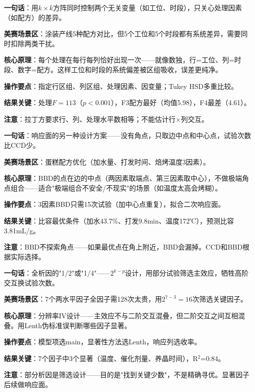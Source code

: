\begin{algobrief}
\textbf{一句话}：用$k\times k$方阵同时控制两个无关变量（如工位、时段），只关心处理因素（如配方）的差异。

\textbf{美赛场景区}：涂装产线5种配方对比，但5个工位和5个时段都有系统差异，需要同时扣除两类干扰。

\textbf{核心原理}：每个处理在每行每列恰好出现一次——就像数独，行=工位、列=时段、数字=配方。这样工位和时段的系统偏差被区组吸收，误差更纯净。

\textbf{操作要点}：指定行区组、列区组、处理因素、因变量；Tukey HSD多重比较。

\textbf{结果关键}：处理$F=113$（$p<0.001$），F3配方最好（均值5.98），F4最差（4.61）。

\textbf{注意}：拉丁方要求行、列、处理水平数相等；不能估计行×列交互。
\end{algobrief}


\begin{algobrief}
\textbf{一句话}：响应面的另一种设计方案——没有角点，只取边中点和中心点，试验次数比CCD少。

\textbf{美赛场景区}：蛋糕配方优化（加水量、打发时间、焙烤温度3因素）。

\textbf{核心原理}：BBD的点在边的中点（两因素取端点、第三因素取中心），不做极端角点组合——适合"极端组合不安全/不现实"的场景（如温度太高会烤糊）。

\textbf{操作要点}：3因素BBD只需15次试验（加中心点重复），拟合二次响应面。

\textbf{结果关键}：比容最优条件（加水43.7\%、打发9.8min、温度172℃），预测比容3.81mL/g。

\textbf{注意}：BBD不探索角点——如果最优点在角上附近，BBD会漏掉。CCD和BBD根据实际选择。
\end{algobrief}


\begin{algobrief}
\textbf{一句话}：全析因的"1/2"或"1/4"——$2^{k-p}$设计，用部分试验筛选主效应，牺牲高阶交互换试验次数。

\textbf{美赛场景区}：7个两水平因子全因子需128次太贵，用$2^{7-3}=16$次筛选关键因子。

\textbf{核心原理}：分辨率IV设计——主效应不与二阶交互混叠，但二阶交互之间互相混叠。用Lenth伪标准误判断哪些因子显著。

\textbf{操作要点}：模型项选main，显著性方法选Lenth，响应列选收率。

\textbf{结果关键}：7个因子中3个显著（温度、催化剂量、养晶时间），R$^2$=0.84。

\textbf{注意}：部分析因是筛选设计——目的是"找到关键少数"，不是精确寻优。显著因子后续做响应面。
\end{algobrief}

